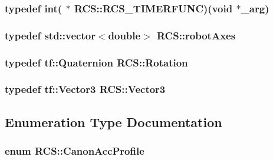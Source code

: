 \hypertarget{namespaceRCS_ae5dd02ab24956844fae02f10de954ad5}{
\subsubsection[{R\-C\-S\-\_\-\-T\-I\-M\-E\-R\-F\-U\-N\-C}]{\setlength{\rightskip}{0pt plus 5cm}typedef int( $\ast$ R\-C\-S\-::\-R\-C\-S\-\_\-\-T\-I\-M\-E\-R\-F\-U\-N\-C)(void $\ast$\-\_\-arg)}}\label{namespaceRCS_ae5dd02ab24956844fae02f10de954ad5}
\hypertarget{namespaceRCS_a3185cefb4d61f5c6f364aaf5624a3ee4}{
\subsubsection[{robot\-Axes}]{\setlength{\rightskip}{0pt plus 5cm}typedef std\-::vector$<$double$>$ {\bf R\-C\-S\-::robot\-Axes}}}\label{namespaceRCS_a3185cefb4d61f5c6f364aaf5624a3ee4}
\hypertarget{namespaceRCS_a3fd915276fdb632d217c560523c320e0}{
\subsubsection[{Rotation}]{\setlength{\rightskip}{0pt plus 5cm}typedef tf\-::\-Quaternion {\bf R\-C\-S\-::\-Rotation}}}\label{namespaceRCS_a3fd915276fdb632d217c560523c320e0}
\hypertarget{namespaceRCS_a688a9db9f1e17b76c410c539997d07a7}{
\subsubsection[{Vector3}]{\setlength{\rightskip}{0pt plus 5cm}typedef tf\-::\-Vector3 {\bf R\-C\-S\-::\-Vector3}}}\label{namespaceRCS_a688a9db9f1e17b76c410c539997d07a7}


\subsection{Enumeration Type Documentation}
\hypertarget{namespaceRCS_a452a9217023e577031dcdf7e533b2ead}{
\subsubsection[{Canon\-Acc\-Profile}]{\setlength{\rightskip}{0pt plus 5cm}enum {\bf R\-C\-S\-::\-Canon\-Acc\-Profile}}}\label{namespaceRCS_a452a9217023e577031dcdf7e533b2ead}


